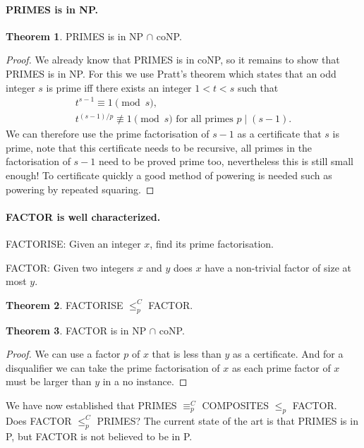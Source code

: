 \documentclass[11pt,a4paper]{article}
\theoremstyle{definition}
\newtheorem{thm}{Theorem}
\begin{document}
\paragraph{PRIMES is in NP.}
\begin{thm}
PRIMES is in NP $\cap$ coNP.
\end{thm}
\begin{proof}
We already know that PRIMES is in coNP, so it remains to show that PRIMES is in NP.
For this we use Pratt's theorem	which states that an odd integer $s$ is prime iff there exists an integer $1 < t< s$ such that
\begin{align*}
t^{s-1} \equiv 1 \pmod{s},\\
t^{(s-1)/p} \not\equiv 1 \pmod{s} \text{ for all primes } p \mid (s-1).
\end{align*}
We can therefore use the prime factorisation of $s-1$ as a certificate that $s$ is prime, note that this certificate needs to be recursive, all primes in the factorisation of $s-1$ need to be proved prime too, nevertheless this is still small enough!
To certificate quickly a good method of powering is needed such as powering by repeated squaring.
\end{proof}

\paragraph{FACTOR is well characterized.}
FACTORISE: Given an integer $x$, find its prime factorisation.

FACTOR: Given two integers $x$ and $y$ does $x$ have a non-trivial factor of size at most $y$.

\begin{thm}
FACTORISE $\le_p^C$ FACTOR.
\end{thm}

\begin{thm}
FACTOR is in NP $\cap$ coNP.
\end{thm}
\begin{proof}
We can use a factor $p$ of $x$ that is less than $y$ as a certificate.
And for a disqualifier we can take the prime factorisation of $x$ as each prime factor of $x$ must be larger than $y$ in a no instance.
\end{proof}

We have now established that PRIMES $\equiv_p^C$ COMPOSITES $\le_p$ FACTOR.
Does FACTOR $\le_p^C$ PRIMES?
The current state of the art is that PRIMES is in P, but FACTOR is not believed to be in P.
\end{document}
